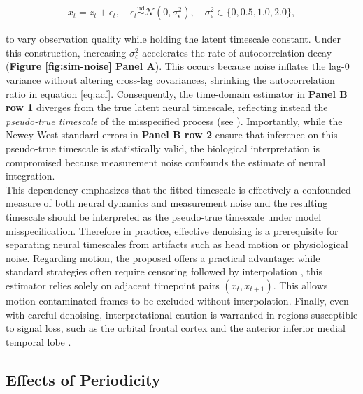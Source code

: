 \documentclass[9pt]{article}
\begin{document}
\begin{align}\label{eq:measurement-noise}
    x_t = z_t + \epsilon_t, \quad \epsilon_t \overset{\text{iid}}{\sim} \mathcal{N}(0, \sigma^2_{\epsilon}), \quad \sigma^2_{\epsilon} \in \{0, 0.5, 1.0, 2.0\},
\end{align}

\noindent to vary observation quality while holding the latent timescale constant. Under this construction, increasing $\sigma^2_\epsilon$ accelerates the rate of autocorrelation decay (\textbf{Figure \ref{fig:sim-noise} Panel A}). This occurs because noise inflates the lag-0 variance without altering cross-lag covariances, shrinking the autocorrelation ratio in equation \eqref{eq:acf}. Consequently, the time-domain estimator in \textbf{Panel B row 1} diverges from the true latent neural timescale, reflecting instead the \textit{pseudo-true timescale} of the misspecified process (see ). Importantly, while the Newey-West standard errors in \textbf{Panel B row 2} ensure that inference on this pseudo-true timescale is statistically valid, the biological interpretation is compromised because measurement noise confounds the estimate of neural integration.\\

This dependency emphasizes that the fitted timescale is effectively a confounded measure of both neural dynamics and measurement noise and the resulting timescale should be interpreted as the pseudo-true timescale under model misspecification. Therefore in practice, effective denoising is a prerequisite for separating neural timescales from artifacts such as head motion or physiological noise. Regarding motion, the proposed  offers a practical advantage: while standard strategies often require censoring followed by interpolation \citep{goldberg_strategies_2024}, this estimator relies solely on adjacent timepoint pairs $(x_t, x_{t+1})$. This allows motion-contaminated frames to be excluded without interpolation. Finally, even with careful denoising, interpretational caution is warranted in regions susceptible to signal loss, such as the orbital frontal cortex and the anterior inferior medial temporal lobe \citep{thomas_yeo_organization_2011, du_organization_2024}.

\subsection{Effects of Periodicity}\label{sec:periodicity}
\end{document}
